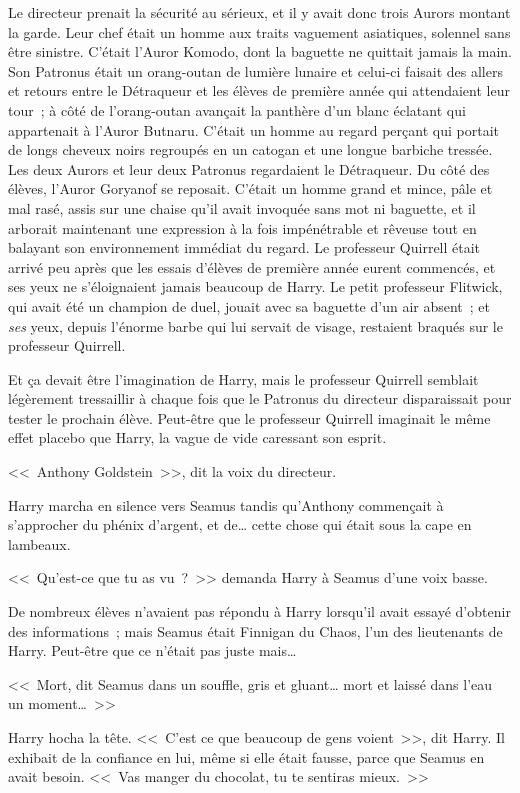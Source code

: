 Le directeur prenait la sécurité au sérieux, et il y avait donc trois Aurors montant la garde. Leur chef était un homme aux traits vaguement asiatiques, solennel sans être sinistre. C'était l'Auror Komodo, dont la baguette ne quittait jamais la main. Son Patronus était un orang-outan de lumière lunaire et celui-ci faisait des allers et retours entre le Détraqueur et les élèves de première année qui attendaient leur tour~; à côté de l'orang-outan avançait la panthère d'un blanc éclatant qui appartenait à l'Auror Butnaru. C'était un homme au regard perçant qui portait de longs cheveux noirs regroupés en un catogan et une longue barbiche tressée. Les deux Aurors et leur deux Patronus regardaient le Détraqueur. Du côté des élèves, l'Auror Goryanof se reposait. C'était un homme grand et mince, pâle et mal rasé, assis sur une chaise qu'il avait invoquée sans mot ni baguette, et il arborait maintenant une expression à la fois impénétrable et rêveuse tout en balayant son environnement immédiat du regard. Le professeur Quirrell était arrivé peu après que les essais d'élèves de première année eurent commencés, et ses yeux ne s'éloignaient jamais beaucoup de Harry. Le petit professeur Flitwick, qui avait été un champion de duel, jouait avec sa baguette d'un air absent~; et \emph{ses} yeux, depuis l'énorme barbe qui lui servait de visage, restaient braqués sur le professeur Quirrell.

Et ça devait être l'imagination de Harry, mais le professeur Quirrell semblait légèrement tressaillir à chaque fois que le Patronus du directeur disparaissait pour tester le prochain élève. Peut-être que le professeur Quirrell imaginait le même effet placebo que Harry, la vague de vide caressant son esprit.

<<~Anthony Goldstein~>>, dit la voix du directeur.

Harry marcha en silence vers Seamus tandis qu'Anthony commençait à s'approcher du phénix d'argent, et de… cette chose qui était sous la cape en lambeaux.

<<~Qu'est-ce que tu as vu~?~>> demanda Harry à Seamus d'une voix basse.

De nombreux élèves n'avaient pas répondu à Harry lorsqu'il avait essayé d'obtenir des informations~; mais Seamus était Finnigan du Chaos, l'un des lieutenants de Harry. Peut-être que ce n'était pas juste mais…

<<~Mort, dit Seamus dans un souffle, gris et gluant… mort et laissé dans l'eau un moment…~>>

Harry hocha la tête. <<~C'est ce que beaucoup de gens voient~>>, dit Harry. Il exhibait de la confiance en lui, même si elle était fausse, parce que Seamus en avait besoin. <<~Vas manger du chocolat, tu te sentiras mieux.~>>

